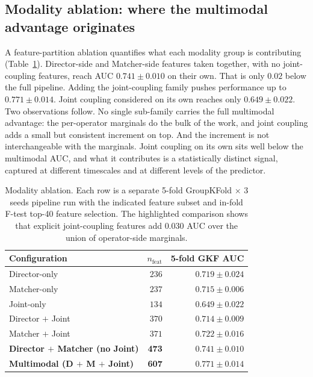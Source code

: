 \subsection{Modality ablation: where the multimodal advantage originates}
A feature-partition ablation quantifies what each modality group is contributing (Table~\ref{tab:ablation}). Director-side and Matcher-side features taken together, with no joint-coupling features, reach AUC $0.741 \pm 0.010$ on their own. That is only $0.02$ below the full pipeline. Adding the joint-coupling family pushes performance up to $0.771 \pm 0.014$. Joint coupling considered on its own reaches only $0.649 \pm 0.022$. Two observations follow. No single sub-family carries the full multimodal advantage: the per-operator marginals do the bulk of the work, and joint coupling adds a small but consistent increment on top. And the increment is not interchangeable with the marginals. Joint coupling on its own sits well below the multimodal AUC, and what it contributes is a statistically distinct signal, captured at different timescales and at different levels of the predictor.

\begin{table}[!t]
\caption[Modality ablation]{Modality ablation. Each row is a separate 5-fold GroupKFold $\times$ 3 seeds pipeline run with the indicated feature subset and in-fold F-test top-40 feature selection. The highlighted comparison shows that explicit joint-coupling features add $0.030$ AUC over the union of operator-side marginals.}
\label{tab:ablation}
\centering
\small
\begin{tabular}{lrr}
\toprule
Configuration & $n_{\text{feat}}$ & 5-fold GKF AUC \\
\midrule
Director-only & $236$ & $0.719 \pm 0.024$ \\
Matcher-only & $237$ & $0.715 \pm 0.006$ \\
Joint-only & $134$ & $0.649 \pm 0.022$ \\
Director $+$ Joint & $370$ & $0.714 \pm 0.009$ \\
Matcher $+$ Joint & $371$ & $0.722 \pm 0.016$ \\
\textbf{Director $+$ Matcher (no Joint)} & \textbf{473} & $\mathbf{0.741 \pm 0.010}$ \\
\textbf{Multimodal (D $+$ M $+$ Joint)} & \textbf{607} & $\mathbf{0.771 \pm 0.014}$ \\
\bottomrule
\end{tabular}
\end{table}


